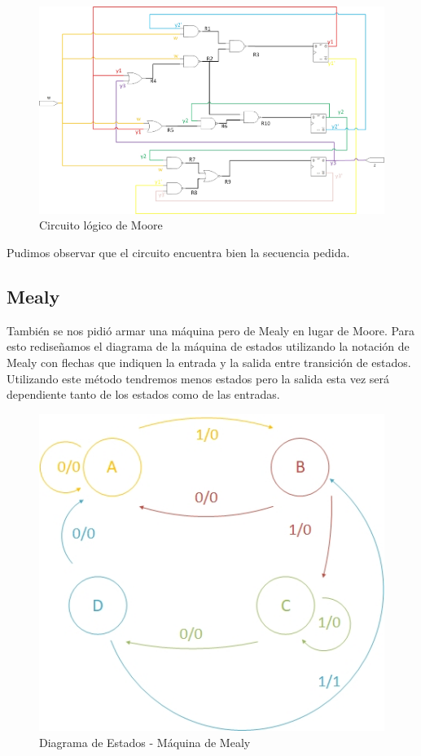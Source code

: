 \documentclass[10pt,a4paper]{article}
\begin{document}
\begin{figure}[H]
\centering
\includegraphics[width=14cm]{Imagenes/TP2_EJ2_MOORE_GREY.jpg}
\caption{Circuito lógico de Moore}
\end{figure}




Pudimos observar que el circuito encuentra bien la secuencia pedida.

\subsection*{Mealy}

También se nos pidi\'o armar una m\'aquina pero de Mealy en lugar de Moore. Para esto rediseñamos el diagrama de la máquina de estados utilizando la notaci\'on de Mealy con flechas que indiquen la entrada y la salida entre transición de estados. Utilizando este método tendremos menos estados pero la salida esta vez será dependiente tanto de los estados como de las entradas.

\begin{figure}[H]
	\centering
	\includegraphics[scale=0.6]{Imagenes/diagestmealy.jpg}
	\caption{Diagrama de Estados - Máquina de Mealy}
	\label{2_fig7}
\end{figure}
\end{document}
